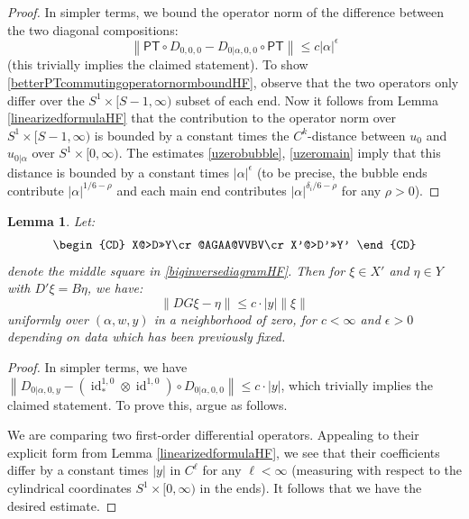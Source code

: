 \documentclass[12pt]{article}
\newtheorem{lemma}[theorem]{Lemma}
\theoremstyle{definition}
\theoremstyle{remark}
\numberwithin{equation}{subsection}
\newcommand{\PT}{\mathsf{PT}}
\newcommand{\id}{\operatorname{id}}
\begin{document}
\begin{proof}
In simpler terms, we bound the operator norm of the difference between the two diagonal compositions:
\begin{equation}\label{betterPTcommutingoperatornormboundHF}
\left\|\PT\circ D_{0,0,0}-D_{0|\alpha,0,0}\circ\PT\right\|\leq c\left|\alpha\right|^\epsilon
\end{equation}
(this trivially implies the claimed statement).  To show \eqref{betterPTcommutingoperatornormboundHF}, observe that the two operators only differ over the $S^1\times[S-1,\infty)$ subset of each end.  Now it follows from Lemma \ref{linearizedformulaHF} that the contribution to the operator norm over $S^1\times[S-1,\infty)$ is bounded by a constant times the $C^k$-distance between $u_0$ and $u_{0|\alpha}$ over $S^1\times[0,\infty)$.  The estimates \eqref{uzerobubble}, \eqref{uzeromain} imply that this distance is bounded by a constant times $\left|\alpha\right|^\epsilon$ (to be precise, the bubble ends contribute $\left|\alpha\right|^{1/6-\rho}$ and each main end contributes $\left|\alpha\right|^{\delta_i/6-\rho}$ for any $\rho>0$).
\end{proof}

\begin{lemma}\label{approxmiddleHF}
Let:
\begin{equation}
\begin{CD}
X@>D>>Y\cr
@AGAA@VVBV\cr
X'@>D'>>Y'
\end{CD}
\end{equation}
denote the middle square in \eqref{biginversediagramHF}.  Then for $\xi\in X'$ and $\eta\in Y$ with $D'\xi=B\eta$, we have:
\begin{equation}
\left\|DG\xi-\eta\right\|\leq c\cdot\left|y\right|\left\|\xi\right\|
\end{equation}
uniformly over $(\alpha,w,y)$ in a neighborhood of zero, for $c<\infty$ and $\epsilon>0$ depending on data which has been previously fixed.
\end{lemma}

\begin{proof}
In simpler terms, we have $\left\|D_{0|\alpha,0,y}-(\id^{1,0}_\ast\otimes\id^{1,0})\circ D_{0|\alpha,0,0}\right\|\leq c\cdot\left|y\right|$, which trivially implies the claimed statement.  To prove this, argue as follows.

We are comparing two first-order differential operators.  Appealing to their explicit form from Lemma \ref{linearizedformulaHF}, we see that their coefficients differ by a constant times $\left|y\right|$ in $C^\ell$ for any $\ell<\infty$ (measuring with respect to the cylindrical coordinates $S^1\times[0,\infty)$ in the ends).  It follows that we have the desired estimate.
\end{proof}
\end{document}
